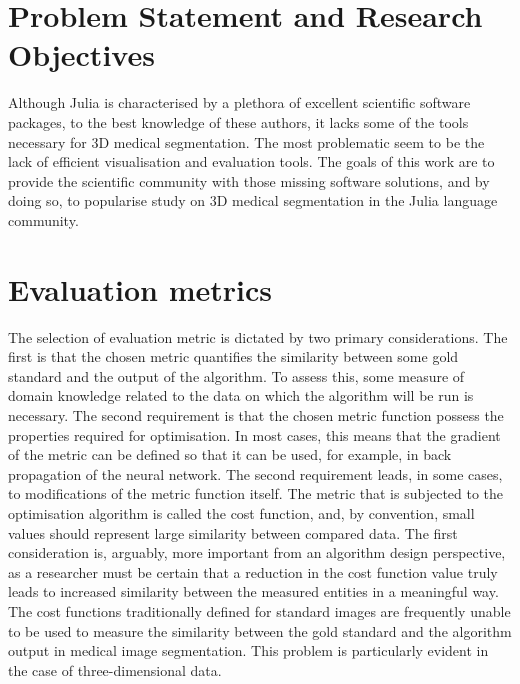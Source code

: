 \documentclass{juliacon}
\begin{document}
\section{Problem Statement and Research Objectives}
Although Julia is characterised by a plethora of excellent scientific software packages, to the best knowledge of these authors, it lacks some of the tools necessary for 3D medical segmentation. The most problematic seem to be the lack of efficient visualisation and evaluation tools. The goals of this work are to provide the scientific community with those missing software solutions, and by doing so, to popularise study on 3D medical segmentation in the Julia language community.


\section{Evaluation metrics}

The selection of evaluation metric is dictated by two primary considerations. The first is that the chosen metric quantifies the similarity between some gold standard and the output of the algorithm. To assess this, some measure of domain knowledge related to the data on which the algorithm will be run is necessary. The second requirement is that the chosen metric function possess  the properties required for optimisation. In most cases, this means that the gradient of the metric can be defined so that it can be used, for example, in back propagation of the neural network. The second requirement leads, in some cases, to modifications of the metric function itself. The metric that is subjected to the optimisation algorithm is called the cost function, and, by convention, small values should represent large similarity between compared data. The first consideration is, arguably, more important from an algorithm design perspective, as a researcher must be certain that a reduction in the cost function value truly leads to increased similarity between the measured entities in a meaningful way. The cost functions traditionally defined for standard images are frequently unable to be used to measure the similarity between the gold standard and the algorithm output in medical image segmentation. This problem is particularly evident in the case of three-dimensional data.
\end{document}
